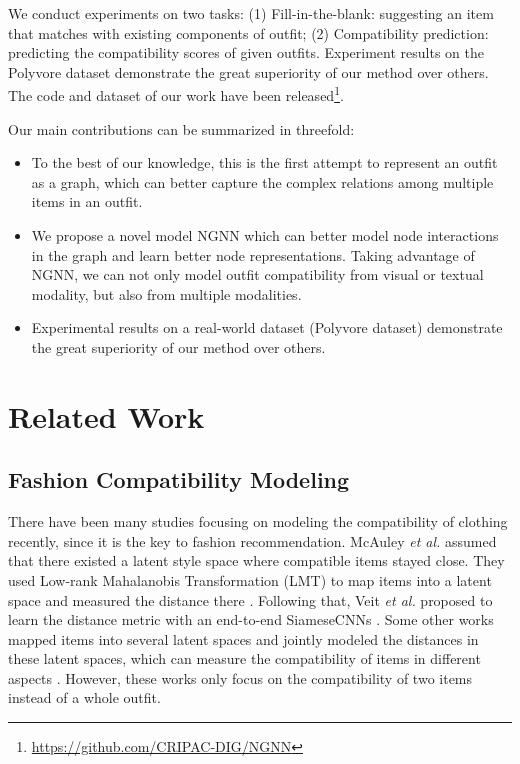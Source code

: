\documentclass[sigconf]{acmart}
\begin{document}
We conduct experiments on two tasks: (1) Fill-in-the-blank: suggesting an item that matches with existing components of outfit;
 (2) Compatibility prediction: predicting the compatibility scores of given outfits.
 Experiment results on the Polyvore dataset demonstrate the great superiority of our method over others.
The code and dataset of our work have been released\footnote{\url{https://github.com/CRIPAC-DIG/NGNN}}.

Our main contributions can be summarized in threefold:
\begin{itemize}
\item To the best of our knowledge, this is the first attempt to represent an outfit as a graph, which can better capture the complex relations among multiple items in an outfit.
\item We propose a novel model NGNN which can better model node interactions in the graph and learn better node representations.
	Taking advantage of NGNN, we can not only model outfit compatibility from visual or textual modality, but also from multiple modalities.
\item Experimental results on a real-world dataset (Polyvore dataset) demonstrate the great superiority of our method over others.
\end{itemize}


\section{Related Work}

\subsection{Fashion Compatibility Modeling}
There have been many studies focusing on modeling the compatibility of clothing recently, since it is the key to fashion recommendation.
McAuley \emph{et al.} assumed that there existed a latent style space where compatible items stayed close. They used Low-rank Mahalanobis Transformation (LMT) to map items into a latent space and measured the distance there \cite{mcauley2015image}. Following that, Veit \emph{et al.} proposed to learn the distance metric with an end-to-end SiameseCNNs \cite{veit2015learning}. Some other works mapped items into several latent spaces and jointly modeled the distances in these latent spaces, which can measure the compatibility of items in different aspects \cite{he2016learning,shih2018compatibility,chen2018Dress}.
However, these works only focus on the compatibility of two items instead of a whole outfit.
\end{document}
